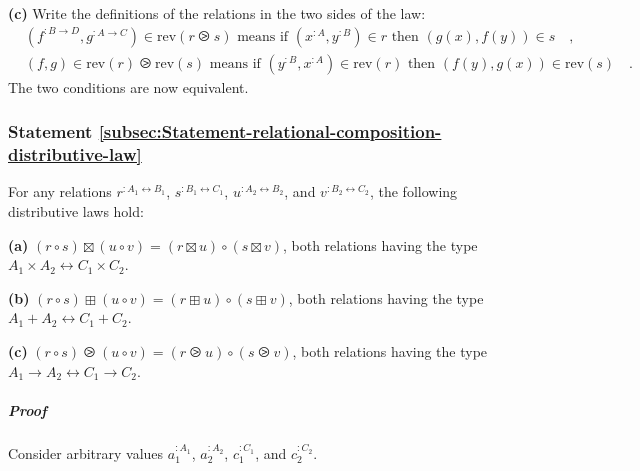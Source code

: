 \textbf{(c)} Write the definitions of the relations in the two sides
of the law:
\begin{align*}
 & (f^{:B\rightarrow D},g^{:A\rightarrow C})\in\text{rev}\left(r\ogreaterthan s\right)\text{ means if }(x^{:A},y^{:B})\in r\text{ then }(g(x),f(y))\in s\quad,\\
 & (f,g)\in\text{rev}\left(r\right)\ogreaterthan\text{rev}\left(s\right)\text{ means if }(y^{:B},x^{:A})\in\text{rev}\left(r\right)\text{ then }(f(y),g(x))\in\text{rev}\left(s\right)\quad.
\end{align*}
The two conditions are now equivalent.

\subsubsection{Statement \label{subsec:Statement-relational-composition-distributive-law}\ref{subsec:Statement-relational-composition-distributive-law}}

For any relations $r^{:A_{1}\leftrightarrow B_{1}}$, $s^{:B_{1}\leftrightarrow C_{1}}$,
$u^{:A_{2}\leftrightarrow B_{2}}$, and $v^{:B_{2}\leftrightarrow C_{2}}$,
the following distributive laws hold:

\textbf{(a)} $(r\circ s)\boxtimes(u\circ v)=(r\boxtimes u)\circ(s\boxtimes v)$,
both relations having the type $A_{1}\times A_{2}\leftrightarrow C_{1}\times C_{2}$.

\textbf{(b)} $(r\circ s)\boxplus(u\circ v)=(r\boxplus u)\circ(s\boxplus v)$,
both relations having the type $A_{1}+A_{2}\leftrightarrow C_{1}+C_{2}$.

\textbf{(c)} $(r\circ s)\ogreaterthan(u\circ v)=(r\ogreaterthan u)\circ(s\ogreaterthan v)$,
both relations having the type $A_{1}\rightarrow A_{2}\leftrightarrow C_{1}\rightarrow C_{2}$.

\subparagraph{Proof}

Consider arbitrary values $a_{1}^{:A_{1}}$, $a_{2}^{:A_{2}}$, $c_{1}^{:C_{1}}$,
and $c_{2}^{:C_{2}}$.

